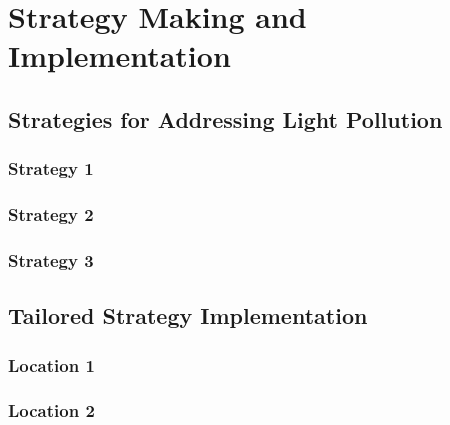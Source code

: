 \MinParskip{}

\section{Strategy Making and Implementation}



\subsection{Strategies for Addressing Light Pollution}

\subsubsection{Strategy 1}

\subsubsection{Strategy 2}

\subsubsection{Strategy 3}


\subsection{Tailored Strategy Implementation}

\subsubsection{Location 1}

\subsubsection{Location 2}



